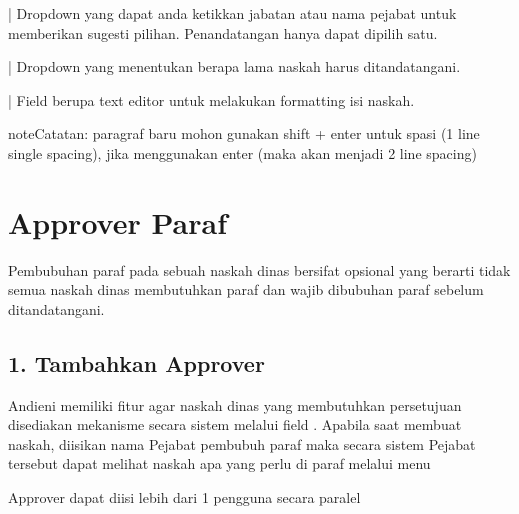 \documentclass[letterpaper,10pt,bahasai]{sphinxmanual}
\begin{document}
\noindent{}

  | Dropdown yang dapat anda ketikkan jabatan atau nama pejabat untuk memberikan sugesti pilihan. Penandatangan hanya dapat dipilih satu.

\noindent{}

 | Dropdown yang menentukan berapa lama naskah harus ditandatangani.

\noindent{}

  | Field berupa text editor untuk melakukan formatting isi naskah.

\noindent{}

\begin{sphinxadmonition}{note}{Catatan:}
paragraf baru mohon gunakan shift + enter untuk spasi (1 line single spacing), jika menggunakan enter (maka akan menjadi 2 line spacing)
\end{sphinxadmonition}


\chapter{Approver \sphinxhyphen{} Paraf}
\label{\detokenize{ciptanaskah:approver-paraf}}
Pembubuhan paraf pada sebuah naskah dinas bersifat opsional yang berarti tidak semua naskah dinas membutuhkan paraf
dan wajib dibubuhan paraf sebelum ditandatangani.


\section{1. Tambahkan Approver}
\label{\detokenize{ciptanaskah:tambahkan-approver}}
Andieni memiliki fitur agar naskah dinas yang membutuhkan persetujuan  disediakan mekanisme secara sistem
melalui field . Apabila saat membuat naskah, diisikan nama Pejabat pembubuh paraf maka secara sistem Pejabat
tersebut dapat melihat naskah apa yang perlu di paraf melalui menu 

\noindent{}

Approver dapat diisi lebih dari 1 pengguna secara paralel

\noindent{}
\end{document}
